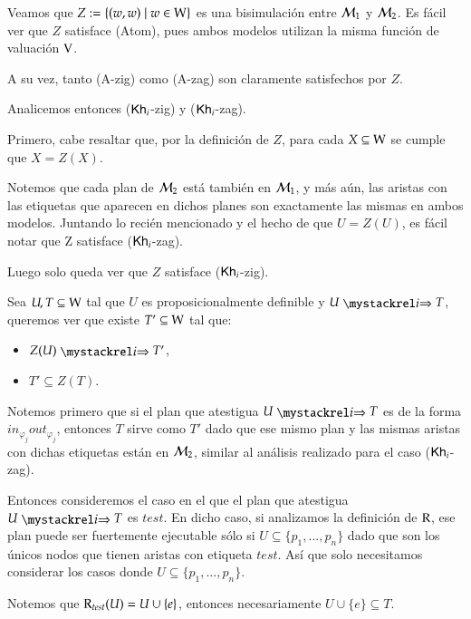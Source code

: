 \begin{demostracion}
\begin{itemize}
    Veamos que $Z := \{(w,w) \mid w \in \mathrm{W} \}$ es una bisimulación entre $\mathcal{M}_1$ y $\mathcal{M}_2$. Es fácil ver que 
    $Z$ satisface (Atom), pues ambos modelos utilizan la misma función de valuación $\mathrm{V}$.

    A su vez, tanto (A-zig) como (A-zag) son claramente satisfechos por $Z$.

    Analicemos entonces ($\mathsf{Kh}_i$-zig) y ($\mathsf{Kh}_i$-zag).

    Primero, cabe resaltar que, por la definición de $Z$, para cada $X \subseteq \mathrm{W}$ se cumple que $X = Z(X)$.

    Notemos que cada plan de $\mathcal{M}_2$ está también en $\mathcal{M}_1$, y más aún, las aristas con las etiquetas 
    que aparecen en dichos planes son exactamente las mismas en ambos modelos. Juntando lo recién mencionado y el hecho de que 
    $U = Z(U)$, es fácil notar que Z satisface ($\mathsf{Kh}_i$-zag).

    Luego solo queda ver que $Z$ satisface ($\mathsf{Kh}_i$-zig).

    Sea $U, T \subseteq \mathrm{W}$ tal que $U$ es proposicionalmente definible y $U \ultsExecAgi T$, queremos ver que existe 
    $T' \subseteq \mathrm{W}$ tal que:

    \begin{multicols}{2}
        \begin{itemize}
            \item $Z(U) \ultsExecAgi T'$, 
            \item $T' \subseteq Z(T)$.
        \end{itemize}
    \end{multicols}

    Notemos primero que si el plan que atestigua $U \ultsExecAgi T$ es de la forma $in_{\varphi_j}out_{\varphi_j}$, 
    entonces $T$ sirve como $T'$ dado que ese mismo plan y las mismas aristas con dichas etiquetas están en $\mathcal{M}_2$, 
    similar al análisis realizado para el caso ($\mathsf{Kh}_i$-zag).

    Entonces consideremos el caso en el que el plan que atestigua $U \ultsExecAgi T$ es $test$. En dicho caso, 
    si analizamos la definición de $\mathrm{R}$, ese plan puede ser fuertemente ejecutable sólo si $U \subseteq \{p_1,...,p_n\}$ 
    dado que son los únicos nodos que tienen aristas con etiqueta $test$. Así que solo necesitamos considerar los casos 
    donde $U \subseteq \{p_1,...,p_n\}$.

    Notemos que $\mathrm{R}_{test}(U) = U \cup \{e\}$, entonces necesariamente $U \cup \{e\} \subseteq T$.


\end{itemize}
\end{demostracion}
